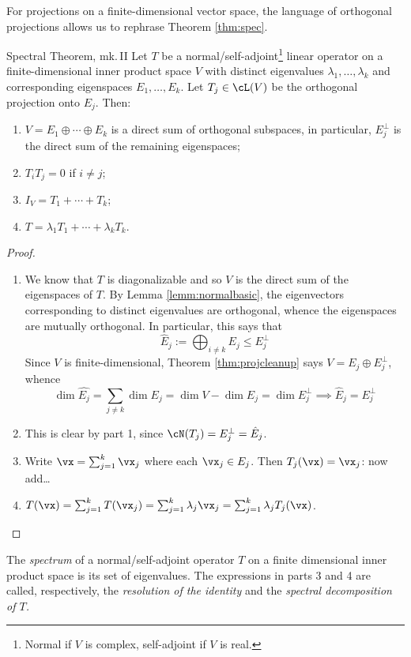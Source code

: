 For projections on a finite-dimensional vector space, the language of orthogonal projections allows us to rephrase Theorem \ref{thm:spec}.
  
\begin{thm}{Spectral Theorem, mk.\,II}{}
Let $T$ be a normal/self-adjoint\footnote{Normal if $V$ is complex, self-adjoint if $V$ is real.} linear operator on a finite-dimensional inner product space $V$ with distinct eigenvalues $\lambda_1,\ldots,\lambda_k$ and corresponding eigenspaces $E_1,\ldots,E_k$. Let $T_j\in\cL(V)$ be the orthogonal projection onto $E_j$. Then:
\begin{enumerate}
  \item $V=E_1\oplus \cdots\oplus E_k$ is a direct sum of orthogonal subspaces, in particular, $E_j^\perp$ is the direct sum of the remaining eigenspaces;
  \item $T_iT_j=0$ if $i\neq j$;
  \item $I_V=T_1+\cdots+T_k$;
  \item $T=\lambda_1T_1+\cdots+\lambda_kT_k$.
\end{enumerate}
\end{thm}

\begin{proof}
\begin{enumerate}
  \item We know that $T$ is diagonalizable and so $V$ is the direct sum of the eigenspaces of $T$. By Lemma \ref{lemm:normalbasic}, the eigenvectors corresponding to distinct eigenvalues are orthogonal, whence the eigenspaces are mutually orthogonal. In particular, this says that
  \[\hat E_j:=\bigoplus_{i\neq k}E_j\le E_j^\perp\]
  Since $V$ is finite-dimensional, Theorem \ref{thm:projcleanup} says $V=E_j\oplus E_j^\perp$, whence
  \[\dim \hat{E_j}=\sum\limits_{j\neq k}\dim E_j=\dim V-\dim E_j=\dim E_j^\perp \implies \hat E_j=E_j^\perp\]
  \item This is clear by part 1, since $\cN(T_j)=E_j^\perp=\hat E_j$.
  \item Write $\vx=\sum_{j=1}^k\vx_j$ where each $\vx_j\in E_j$. Then $T_j(\vx)=\vx_j$: now add\ldots
  \item $T(\vx)=\sum_{j=1}^kT(\vx_j)=\sum_{j=1}^k\lambda_j\vx_j=\sum_{j=1}^k\lambda_jT_j(\vx)$.\qedhere
\end{enumerate}
\end{proof}

\begin{defn}{}{}
The \emph{spectrum} of a normal/self-adjoint operator $T$ on a finite dimensional inner product space is its set of eigenvalues. The expressions in parts 3 and 4 are called, respectively, the \emph{resolution of the identity} and the \emph{spectral decomposition of $T$.}
\end{defn}

